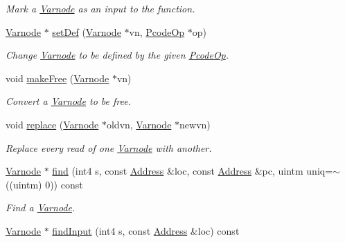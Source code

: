 \begin{DoxyCompactItemize}
\begin{DoxyCompactList}\small\item\em Mark a \mbox{\hyperlink{class_varnode}{Varnode}} as an input to the function. \end{DoxyCompactList}\item 
\mbox{\hyperlink{class_varnode}{Varnode}} $\ast$ \mbox{\hyperlink{class_varnode_bank_ac151db372e9299db20ad0808140877e1}{set\+Def}} (\mbox{\hyperlink{class_varnode}{Varnode}} $\ast$vn, \mbox{\hyperlink{class_pcode_op}{Pcode\+Op}} $\ast$op)
\begin{DoxyCompactList}\small\item\em Change \mbox{\hyperlink{class_varnode}{Varnode}} to be defined by the given \mbox{\hyperlink{class_pcode_op}{Pcode\+Op}}. \end{DoxyCompactList}\item 
void \mbox{\hyperlink{class_varnode_bank_a8020195947e2b6faea7f18f591572c47}{make\+Free}} (\mbox{\hyperlink{class_varnode}{Varnode}} $\ast$vn)
\begin{DoxyCompactList}\small\item\em Convert a \mbox{\hyperlink{class_varnode}{Varnode}} to be {\itshape free}. \end{DoxyCompactList}\item 
void \mbox{\hyperlink{class_varnode_bank_a9475fbf8af64f0e08f9d853791717169}{replace}} (\mbox{\hyperlink{class_varnode}{Varnode}} $\ast$oldvn, \mbox{\hyperlink{class_varnode}{Varnode}} $\ast$newvn)
\begin{DoxyCompactList}\small\item\em Replace every read of one \mbox{\hyperlink{class_varnode}{Varnode}} with another. \end{DoxyCompactList}\item 
\mbox{\hyperlink{class_varnode}{Varnode}} $\ast$ \mbox{\hyperlink{class_varnode_bank_a056ab94c55c202947cdaf9ccce709d01}{find}} (int4 s, const \mbox{\hyperlink{class_address}{Address}} \&loc, const \mbox{\hyperlink{class_address}{Address}} \&pc, uintm uniq=$\sim$((uintm) 0)) const
\begin{DoxyCompactList}\small\item\em Find a \mbox{\hyperlink{class_varnode}{Varnode}}. \end{DoxyCompactList}\item 
\mbox{\hyperlink{class_varnode}{Varnode}} $\ast$ \mbox{\hyperlink{class_varnode_bank_a5375b59862f62539df76d67de60414c6}{find\+Input}} (int4 s, const \mbox{\hyperlink{class_address}{Address}} \&loc) const

\end{DoxyCompactItemize}
